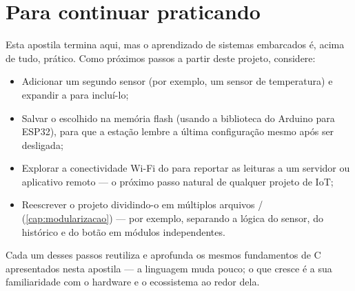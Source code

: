 \section{Para continuar praticando}

Esta apostila termina aqui, mas o aprendizado de sistemas embarcados é, acima de tudo, prático. Como próximos passos a partir deste projeto, considere:

\begin{itemize}
    \item Adicionar um segundo sensor (por exemplo, um sensor de temperatura) e expandir a  para incluí-lo;
    \item Salvar o  escolhido na memória flash (usando a biblioteca  do Arduino para ESP32), para que a estação lembre a última configuração mesmo após ser desligada;
    \item Explorar a conectividade Wi-Fi do \ESP{} para reportar as leituras a um servidor ou aplicativo remoto — o próximo passo natural de qualquer projeto de IoT;
    \item Reescrever o projeto dividindo-o em múltiplos arquivos / (\cref{cap:modularizacao}) — por exemplo, separando a lógica do sensor, do histórico e do botão em módulos independentes.
\end{itemize}

Cada um desses passos reutiliza e aprofunda os mesmos fundamentos de C apresentados nesta apostila — a linguagem muda pouco; o que cresce é a sua familiaridade com o hardware e o ecossistema ao redor dela.

